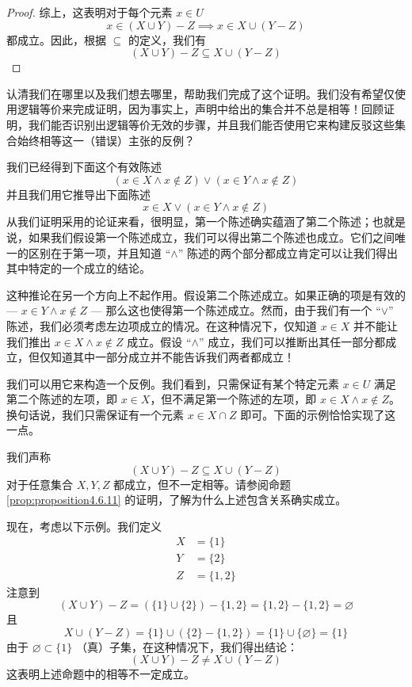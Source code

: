 \begin{proof}
    综上，这表明对于每个元素 $x \in U$ 
    \[x \in (X \cup Y ) - Z \implies x \in X \cup (Y - Z)\]
    都成立。因此，根据 $\subseteq$ 的定义，我们有
    \[(X \cup Y ) - Z \subseteq X \cup (Y - Z)\]
\end{proof}

认清我们在哪里以及我们想去哪里，帮助我们完成了这个证明。我们没有希望仅使用逻辑等价来完成证明，因为事实上，声明中给出的集合并不总是相等！回顾证明，我们能否识别出逻辑等价无效的步骤，并且我们能否使用它来构建反驳这些集合始终相等这一（错误）主张的反例？

我们已经得到下面这个有效陈述
\[(x \in X \land x \notin Z) \lor (x \in Y \land x \notin Z)\]
并且我们用它推导出下面陈述
\[x \in X \lor (x \in Y \land x \notin Z)\]
从我们证明采用的论证来看，很明显，第一个陈述确实蕴涵了第二个陈述；也就是说，如果我们假设第一个陈述成立，我们可以得出第二个陈述也成立。它们之间唯一的区别在于第一项，并且知道 ``$\land$'' 陈述的两个部分都成立肯定可以让我们得出其中特定的一个成立的结论。

这种推论在另一个方向上不起作用。假设第二个陈述成立。如果正确的项是有效的 --- $x \in Y \land x \notin Z$ --- 那么这也使得第一个陈述成立。然而，由于我们有一个 ``$\lor$'' 陈述，我们必须考虑左边项成立的情况。在这种情况下，仅知道 $x \in X$ 并不能让我们推出 $x \in X \land x \notin Z$ 成立。假设 ``$\land$'' 成立，我们可以推断出其任一部分都成立，但仅知道其中一部分成立并不能告诉我们两者都成立！

我们可以用它来构造一个反例。我们看到，只需保证有某个特定元素 $x \in U$ 满足第二个陈述的左项，即 $x \in X$，但不满足第一个陈述的左项，即 $x \in X \land x \notin Z$。换句话说，我们只需保证有一个元素 $x \in X \cap Z$ 即可。下面的示例恰恰实现了这一点。\\

\begin{example}
    我们声称
    \[(X \cup Y ) - Z \subseteq X \cup (Y - Z)\]
    对于任意集合 $X,Y,Z$ 都成立，但不一定相等。请参阅命题 \ref{prop:proposition4.6.11} 的证明，了解为什么上述包含关系确实成立。
\end{example}

现在，考虑以下示例。我们定义
\begin{align*}
    X &= \{1\} \\
    Y &= \{2\} \\
    Z &= \{1, 2\}
\end{align*}
注意到
\[(X \cup Y ) - Z = (\{1\} \cup \{2\}) - \{1, 2\} = \{1, 2\} - \{1, 2\} = \varnothing\]
且
\[X \cup (Y - Z) = \{1\} \cup (\{2\} - \{1, 2\}) = \{1\} \cup \{\varnothing\} = \{1\}\]
由于 $\varnothing \subset \{1\}$ （真）子集，在这种情况下，我们得出结论：
\[(X \cup Y ) - Z \ne X \cup (Y - Z)\]
这表明上述命题中的相等不一定成立。

